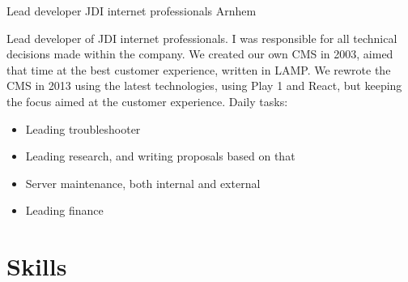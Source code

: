 \documentclass[11pt,a4paper]{moderncv}
\begin{document}
\vspace*{0.2\baselineskip}
{Lead developer}
{JDI internet professionals}
{Arnhem}
{}
{
    Lead developer of JDI internet professionals. I was responsible for all technical decisions made within the company.
    We created our own CMS in 2003, aimed that time at the best customer experience, written in LAMP.
    We rewrote the CMS in 2013 using the latest technologies, using Play 1 and React, but keeping the focus aimed at the customer experience.
    \newline{}%
    Daily tasks:%
    \begin{itemize}
        \item Leading troubleshooter
        \item Leading research, and writing proposals based on that
        \item Server maintenance, both internal and external
        \item Leading finance
    \end{itemize}
}

\section{Skills}
\end{document}

